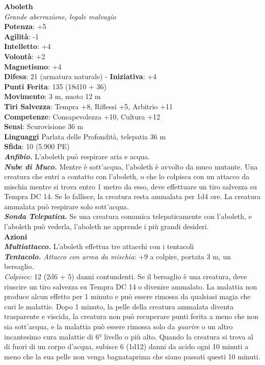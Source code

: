 \begin{multicols}{2}

\textbf{Aboleth}\\
\emph{Grande aberrazione, legale malvagio}\\
\textbf{Potenza}: +5\\
\textbf{Agilità}: -1\\
\textbf{Intelletto}: +4\\
\textbf{Volontà}: +2\\
\textbf{Magnetismo}: +4\\
\textbf{Difesa}: 21 (armatura naturale) - \textbf{Iniziativa}: +4\\
\textbf{Punti Ferita}: 135 (18d10 + 36)\\
\textbf{Movimento}: 3 m, nuoto 12 m\\
\textbf{Tiri Salvezza}: Tempra +8, Riflessi +5, Arbitrio +11\\
\textbf{Competenze}: Consapevolezza +10, Cultura +12\\
\textbf{Sensi}: Scurovisione 36 m\\
\textbf{Linguaggi} Parlata delle Profondità, telepatia 36 m\\
\textbf{Sfida}: 10 (5.900 PE)\\
\smallskip
\emph{\textbf{Anfibio.}} L'aboleth può respirare aria e acqua.\\
\emph{\textbf{Nube di Muco.}} Mentre è sott'acqua, l'aboleth è avvolto da muco mutante. Una creatura che entri a contatto con l'aboleth, o che lo colpisca con un attacco da mischia mentre si trova entro 1 metro da esso, deve effettuare un tiro salvezza su Tempra DC 14. Se lo fallisce, la creatura resta ammalata per 1d4 ore. La creatura ammalata può respirare solo sott'acqua.\\
\emph{\textbf{Sonda Telepatica.}} Se una creatura comunica telepaticamente con l'aboleth, e l'aboleth può vederla, l'aboleth ne apprende i più grandi desideri. \\
\smallskip\textbf{Azioni}\\
\emph{\textbf{Multiattacco.}} L'aboleth effettua tre attacchi con i tentacoli\\
\emph{\textbf{Tentacolo.} Attacco con arma da mischia}: +9 a colpire, portata 3 m, un bersaglio.\\
\emph{Colpisce:} 12 (2d6 + 5) danni contundenti. Se il bersaglio è una creatura, deve riuscire un tiro salvezza su Tempra DC 14 o divenire ammalato. La malattia non produce alcun effetto per 1 minuto e può essere rimossa da qualsiasi magia che curi le malattie. Dopo 1 minuto, la pelle della creatura ammalata diventa trasparente e viscida, la creatura non può recuperare punti ferita a meno che non sia sott'acqua, e la malattia può essere rimossa solo da \emph{guarire} o un altro incantesimo cura malattie di 6° livello o più alto. Quando la creatura si trova al di fuori di un corpo d'acqua, subisce 6 (1d12) danni da acido ogni 10 minuti a meno che la sua pelle non venga bagnataprima che siano  passati questi 10 minuti. \\

\end{multicols}

